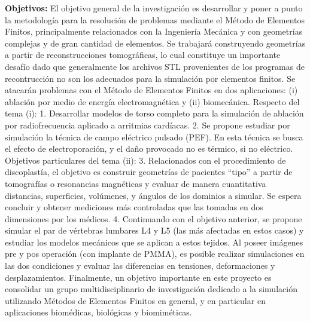 \documentclass[a4paper,11pt,twoside,final,titlepage,onecolumn,openright]{report}
\begin{document}
\begin{itemize}
		      {\bf Objetivos:} El objetivo general de la investigación es desarrollar y poner a punto la metodología para la resolución de problemas mediante el Método de Elementos Finitos, principalmente relacionados con la Ingeniería Mecánica y con geometrías complejas y de gran cantidad de elementos. Se trabajará construyendo geometrías a partir de reconstrucciones tomográficas, lo cual constituye un importante desafío dado que generalmente los archivos STL provenientes de los programas de recontrucción no son los adecuados para la simulación por elementos finitos. Se atacarán problemas con el Método de Elementos Finitos en dos aplicaciones: (i) ablación por medio de energía electromagnética y (ii) biomecánica. Respecto del tema (i): 1. Desarrollar modelos de torso completo para la simulación de ablación por radiofrecuencia aplicado a arritmias cardíacas. 2. Se propone estudiar por simulación la técnica de campo eléctrico pulsado (PEF). En esta técnica se busca el efecto de electroporación, y el daño provocado no es térmico, si no eléctrico. Objetivos particulares del tema (ii): 3. Relacionados con el procedimiento de discoplastía, el objetivo es construir geometrías de pacientes “tipo” a partir de tomografías o resonancias magnéticas y evaluar de manera cuantitativa distancias, superficies, volúmenes, y ángulos de los dominios a simular. Se espera concluir y obtener mediciones más controladas que las tomadas en dos dimensiones por los médicos. 4. Continuando con el objetivo anterior, se propone simular el par de vértebras lumbares L4 y L5 (las más afectadas en estos casos) y estudiar los modelos mecánicos que se aplican a estos tejidos. Al poseer imágenes pre y pos operación (con implante de PMMA), es posible realizar simulaciones en las dos condiciones y evaluar las diferencias en tensiones, deformaciones y desplazamientos. Finalmente, un objetivo importante en este proyecto es consolidar un grupo multidisciplinario de investigación dedicado a la simulación utilizando Métodos de Elementos Finitos en general, y en particular en aplicaciones biomédicas, biológicas y biomiméticas.


\end{itemize}
\end{document}
